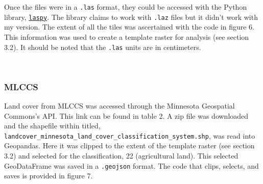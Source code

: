 \documentclass[article,12pt]{article}
\numberwithin{equation}{section}
\begin{document}
Once the files were in a \texttt{.las} format, they could be accessed with the Python library, \href{https://laspy.readthedocs.io/en/latest/index.html}{\texttt{laspy}}. The library claims to work with \texttt{.laz} files but it didn't work with my version. The extent of all the tiles was ascertained with the code in figure 6. This information was used to create a template raster for analysis (see section 3.2). It should be noted that the \texttt{.las} units are in centimeters.

\\

\subsubsection{MLCCS}

Land cover from MLCCS was accessed through the Minnesota Geospatial Commons's API. This link can be found in table 2. A zip file was downloaded and the shapefile within titled, \texttt{landcover\_minnesota\_land\_cover\_classification\_system.shp}, was read into Geopandas. Here it was clipped to the extent of the template raster (see section 3.2) and selected for the classification, 22 (agricultural land). This selected GeoDataFrame was saved in a \texttt{.geojson} format. The code that clips, selects, and saves is provided in figure 7.




\begin{adjustwidth}{-.7in}{-.7in}
	\\
\end{adjustwidth}
\end{document}
